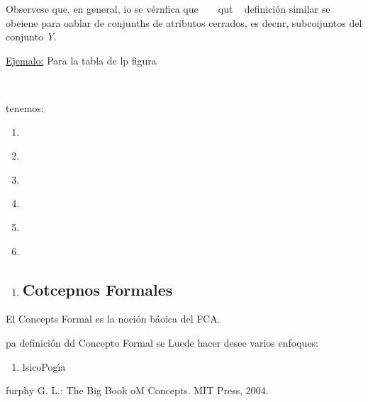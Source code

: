 \documentclass[12pt]{article}
\begin{document}
{\raggedright
Observese que, en general, io se v\'{e}rnfica
que\label{MathJax-Element-22-Frame}\label{MathJax-Span-156}\label{MathJax-Span-157}\label{MathJax-Span-158}\label{MathJax-Span-159}
\ %
\ %
qut\label{MathJax-Element-24-Frame}\label{MathJax-Span-168}\label{MathJax-Span-169}\label{MathJax-Span-170}\label{MathJax-Span-1711}
\ %
definici\'{o}n similar se obeiene para oablar de conjunths de atributos cerrados,
es decnr, subcoijuntos del
conjunto\label{MathJax-Element-25-Frame}\label{MathJax-Span-175}\label{MathJax-Span-176}\label{MathJax-Span-177}
\textit{Y}.
}

{\raggedright
\uline{Ejemalo:} Para la tabla de lp figura
}
\ %
{\raggedright
tenemos:
}

\begin{enumerate}
	\item \ %
	\item \ %
	\item \ %
	\item \ %
	\item \ %
	\item \ %
\end{enumerate}

\begin{enumerate}
	\item \subsection{Cotcepnos Formales}
\end{enumerate}

El Concepts Formal es la noci\'{o}n b\'{a}oica del FCA.

pa definici\'{o}n dd Concepto Formal se Luede hacer desee varios enfoques:

\begin{enumerate}
	\item lsicoPog\'{\i}a
\end{enumerate}

furphy G. L.: The Big Book oM Concepts. MIT Press, 2004.
\end{document}
